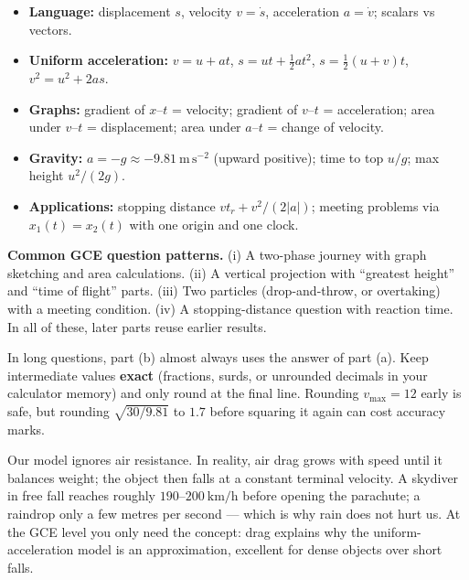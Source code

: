 \documentclass[11pt]{article}
\newcommand{\cle}[1]{{\popxbold\color{popdark}#1}}
\newcounter{popsec}
\newcounter{popsub}
\newcommand{\courssub}[1]{%
  \stepcounter{popsub}%
  \par\vspace{9pt}\noindent{\popxbold\fontsize{11.5}{13}\selectfont\color{popink}{\color{poporange}\thepopsec.\thepopsub}\hspace{6pt}#1}\par\nopagebreak\vspace{4pt}
}
\begin{document}
\courssub{Chapter Synthesis and GCE Strategy}

\begin{aretenir}
\begin{itemize}
\item \textbf{Language:} displacement $s$, velocity $v = \dot{s}$, acceleration $a = \dot{v}$; scalars vs vectors.
\item \textbf{Uniform acceleration:} $v = u + at$,\; $s = ut + \tfrac12 at^{2}$,\; $s = \tfrac12(u+v)t$,\; $v^{2} = u^{2} + 2as$.
\item \textbf{Graphs:} gradient of $x$--$t$ = velocity; gradient of $v$--$t$ = acceleration; area under $v$--$t$ = displacement; area under $a$--$t$ = change of velocity.
\item \textbf{Gravity:} $a = -g \approx -9.81\ \mathrm{m\,s^{-2}}$ (upward positive); time to top $u/g$; max height $u^{2}/(2g)$.
\item \textbf{Applications:} stopping distance $v t_r + v^{2}/(2|a|)$; meeting problems via $x_1(t) = x_2(t)$ with one origin and one clock.
\end{itemize}
\end{aretenir}

\textbf{Common GCE question patterns.} (i) A two-phase journey with graph sketching and area calculations. (ii) A vertical projection with ``greatest height'' and ``time of flight'' parts. (iii) Two particles (drop-and-throw, or overtaking) with a meeting condition. (iv) A stopping-distance question with reaction time. In all of these, later parts reuse earlier results.

\begin{attention}
In long questions, part (b) almost always uses the answer of part (a). Keep intermediate values \textbf{exact} (fractions, surds, or unrounded decimals in your calculator memory) and only round at the final line. Rounding $v_{\max} = 12$ early is safe, but rounding $\sqrt{30/9.81}$ to $1.7$ before squaring it again can cost accuracy marks.
\end{attention}

\begin{savaistu}
Our model ignores air resistance. In reality, air drag grows with speed until it balances weight; the object then falls at a constant \cle{terminal velocity}. A skydiver in free fall reaches roughly $190$--$200\ \mathrm{km/h}$ before opening the parachute; a raindrop only a few metres per second --- which is why rain does not hurt us. At the GCE level you only need the concept: drag explains why the uniform-acceleration model is an approximation, excellent for dense objects over short falls.
\end{savaistu}
\end{document}
